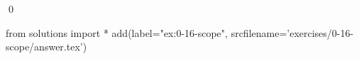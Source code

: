 
\begin{ex}
  \label{ex:0-16-scope}
  
  \qed
\end{ex}
\begin{python0}
from solutions import *
add(label="ex:0-16-scope",
    srcfilename='exercises/0-16-scope/answer.tex')
\end{python0}
